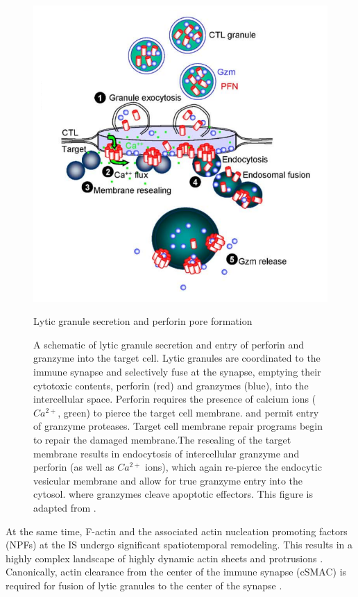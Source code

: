 \begin{figure}[htbp]
	\centering
	\includegraphics[width=\textwidth]{../figures/chapter1/degranulation.png}
	\caption{Lytic granule secretion and perforin pore formation}
	\caption*{A schematic of lytic granule secretion and entry of perforin and granzyme into the target cell. Lytic granules are coordinated to the immune synapse and selectively fuse at the synapse, emptying their cytotoxic contents, perforin (red) and granzymes (blue), into the intercellular space. Perforin requires the presence of calcium ions ($Ca^{2+}$, green) to pierce the target cell membrane. and permit entry of granzyme proteases. Target cell membrane repair programs begin to repair the damaged membrane.The resealing of the target membrane results in endocytosis of intercellular granzyme and perforin (as well as $Ca^{2+}$ ions), which again re-pierce the endocytic vesicular membrane and allow for true granzyme entry into the cytosol. where granzymes cleave apoptotic effectors. This figure is adapted from \cite{Keefe2005_2}.}
	\label{fig:degranulation}
\end{figure}

At the same time, F-actin and the associated actin nucleation promoting factors (NPFs) at the IS undergo significant spatiotemporal remodeling. This results in a highly complex landscape of highly dynamic actin sheets and protrusions \cite{Ritter2015}. Canonically, actin clearance from the center of the immune synapse (cSMAC) is required for fusion of lytic granules to the center of the synapse \cite{Ritter2015}. 

